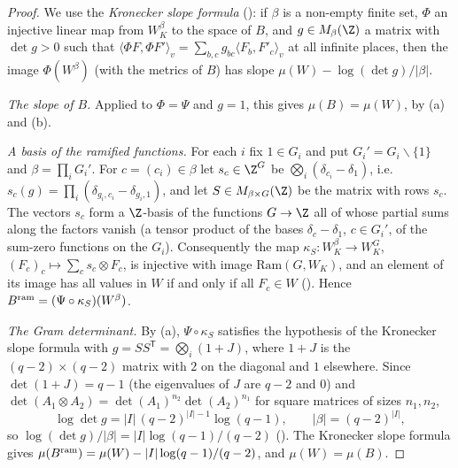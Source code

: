 \begin{proof}
We use the \emph{Kronecker slope formula} (): if $\beta$ is a non-empty finite set,
$\Phi$ an injective linear map from $W_K^\beta$ to the space of $B$, and $g\in M_\beta(\Z)$ a matrix with $\det g>0$ such
that $\langle\Phi F,\Phi F'\rangle_v=\sum_{b,c}g_{bc}\langle F_b,F'_c\rangle_v$ at all infinite places, then the image
$\Phi(W^\beta)$ (with the metrics of $B$) has slope $\mu(W)-\log(\det g)/|\beta|$.

\emph{The slope of $B$.} Applied to $\Phi=\Psi$ and $g=1$, this gives $\mu(B)=\mu(W)$, by (a) and (b).

\emph{A basis of the ramified functions.} For each $i$ fix $1\in G_i$ and put $G_i'=G_i\smallsetminus\{1\}$ and
$\beta=\prod_iG_i'$. For $c=(c_i)\in\beta$ let $s_c\in\Z^G$ be $\bigotimes_i(\delta_{c_i}-\delta_1)$, i.e.\
$s_c(g)=\prod_i(\delta_{g_i,c_i}-\delta_{g_i,1})$, and let $S\in M_{\beta\times G}(\Z)$ be the matrix with rows $s_c$. The
vectors $s_c$ form a $\Z$-basis of the functions $G\to\Z$ all of whose partial sums along the factors vanish (a
tensor product of the bases $\delta_c-\delta_1$, $c\in G_i'$, of the sum-zero functions on the $G_i$). Consequently the map
$\kappa_S\colon W_K^\beta\to W_K^G$, $(F_c)_c\mapsto\sum_cs_c\otimes F_c$, is injective with image $\mathrm{Ram}(G,W_K)$,
and an element of its image has all values in $W$ if and only if all $F_c\in W$
(). Hence
$B^{\mathrm{ram}}=(\Psi\circ\kappa_S)(W^\beta)$.

\emph{The Gram determinant.} By (a), $\Psi\circ\kappa_S$ satisfies the hypothesis of the Kronecker slope formula with
$g=SS^{\mathsf T}=\bigotimes_i(1+J)$, where $1+J$ is the $(q-2)\times(q-2)$ matrix with $2$ on the diagonal and $1$
elsewhere. Since $\det(1+J)=q-1$ (the eigenvalues of $J$ are $q-2$ and $0$) and
$\det(A_1\otimes A_2)=\det(A_1)^{n_2}\det(A_2)^{n_1}$ for square matrices of sizes $n_1,n_2$,
\[
\log\det g=|I|\,(q-2)^{|I|-1}\log(q-1),\qquad|\beta|=(q-2)^{|I|},
\]
so $\log(\det g)/|\beta|=|I|\log(q-1)/(q-2)$ (). The Kronecker slope
formula gives $\mu(B^{\mathrm{ram}})=\mu(W)-|I|\log(q-1)/(q-2)$, and $\mu(W)=\mu(B)$.
\end{proof}

